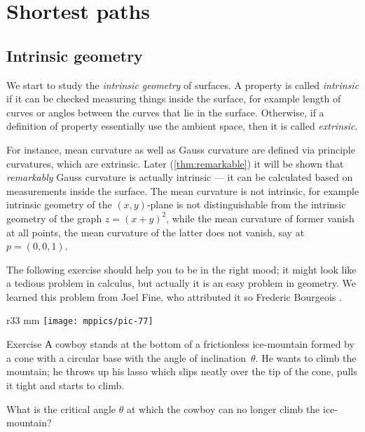 \chapter{Shortest paths}

\section{Intrinsic geometry}

We start to study the \emph{intrinsic geometry} of surfaces.
A property is called \emph{intrinsic} if it can be checked measuring things inside the surface, for example length of curves or angles between the curves that lie in the surface.
Otherwise, if a definition of property essentially use the ambient space, then it is called \emph{extrinsic}.

For instance, mean curvature as well as Gauss curvature are defined via principle curvatures, which are extrinsic.
Later (\ref{thm:remarkable}) it will be shown that \emph{remarkably} Gauss curvature is actually intrinsic --- it can be calculated based on measurements inside the surface.
The mean curvature is not intrinsic, for example intrinsic geometry of the $(x,y)$-plane is not distinguishable from the intrinsic geometry of the graph $z=(x+y)^2$,
while the mean curvature of former vanish at all points, the mean curvature of the latter does not vanish, say at $p=(0,0,1)$.  

The following exercise should help you to be in the right mood;
it might look like a tedious problem in calculus, but actually it is an easy problem in geometry.
We learned this problem from Joel Fine, who attributed it so Frederic Bourgeois \cite{fine}.

\begin{wrapfigure}[6]{r}{33 mm}
\vskip-6mm
\centering
\texttt{[image: mppics/pic-77]}
\vskip-0mm
\end{wrapfigure}

\begin{thm}{Exercise}\label{ex:lasso}
А cowboy stands at the bottom of a frictionless ice-mountain formed by a cone with a circular base with the angle  of inclination~$\theta$.
He wants to climb the mountain;
he throws up his lasso which slips neatly over the tip of the cone, pulls it tight and starts to climb.

What is the critical angle $\theta$ at which the cowboy can no longer climb the ice-mountain?
\end{thm}

